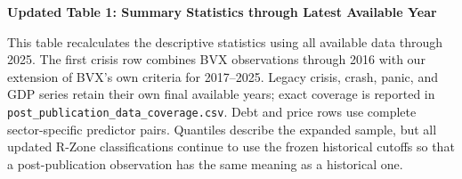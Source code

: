 \documentclass[11pt]{article}
\begin{document}
\noindent\textbf{Updated Table 1: Summary Statistics through Latest Available Year}

\smallskip
\noindent\footnotesize
This table recalculates the descriptive statistics using all available data
through 2025. The first crisis row combines BVX observations through 2016 with
our extension of BVX's own criteria for
2017--2025. Legacy crisis, crash, panic, and GDP series retain their own final
available years; exact coverage is reported in
\texttt{post\_publication\_data\_coverage.csv}. Debt and price rows use complete
sector-specific predictor pairs. Quantiles describe the expanded sample, but
all updated R-Zone classifications continue to use the frozen historical
cutoffs so that a post-publication observation has the same meaning as a
historical one.

\normalsize
\medskip
\begin{center}

\end{center}
\end{document}
